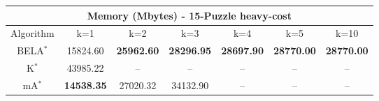 \begin{tabular}{c|cccccc}\toprule
\multicolumn{7}{c}{Memory (Mbytes) - 15-Puzzle heavy-cost}\\ \midrule
Algorithm & k=1 & k=2 & k=3 & k=4 & k=5 & k=10 \\ \midrule
BELA$^*$ & 15824.60 & \textbf{25962.60} & \textbf{28296.95} & \textbf{28697.90} & \textbf{28770.00} & \textbf{28770.00} \\
K$^*$ & 43985.22 & -- & -- & -- & -- & -- \\
mA$^*$ & \textbf{14538.35} & 27020.32 & 34132.90 & -- & -- & -- \\ \bottomrule 
\end{tabular}
